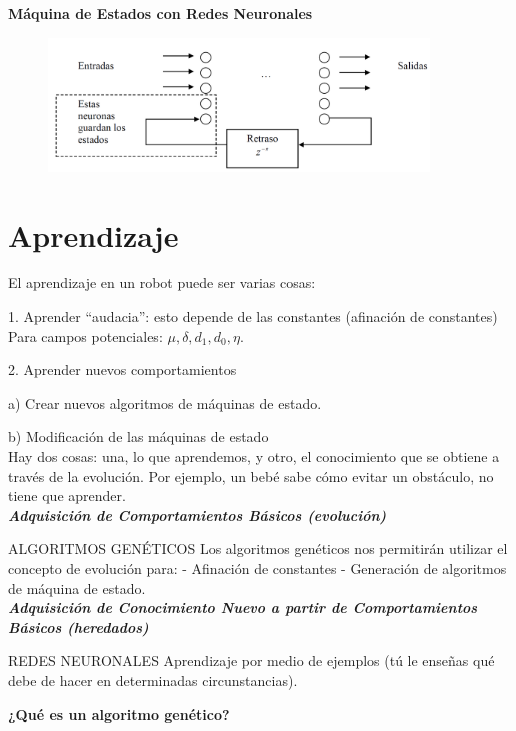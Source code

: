 \textbf{Máquina de Estados con Redes Neuronales}

\begin{figure}[h!]
	\centering
	\includegraphics[width=0.9\textwidth]{images/img81.png}
	\label{figura81}
\end{figure}


\section{Aprendizaje}

El aprendizaje en un robot puede ser varias cosas:

1. Aprender “audacia”: esto depende de las constantes (afinación de constantes)
Para campos potenciales: $\mu, \delta, d_1, d_0, \eta $.

2. Aprender nuevos comportamientos

a) Crear nuevos algoritmos de máquinas de estado.

b) Modificación de las máquinas de estado \\

Hay dos cosas: una, lo que aprendemos, y otro, el conocimiento que se obtiene a través de la evolución. Por
ejemplo, un bebé sabe cómo evitar un obstáculo, no tiene que aprender. \\



\textbf{\textit{Adquisición de Comportamientos Básicos (evolución)}}

ALGORITMOS GENÉTICOS
Los algoritmos genéticos nos permitirán utilizar el concepto de evolución para:
- Afinación de constantes
- Generación de algoritmos de máquina de estado. \\


\textbf{\textit{Adquisición de Conocimiento Nuevo a partir de Comportamientos Básicos (heredados)}}

REDES NEURONALES
Aprendizaje por medio de ejemplos (tú le enseñas qué debe de hacer en determinadas circunstancias).


\textbf{¿Qué es un algoritmo genético?}

